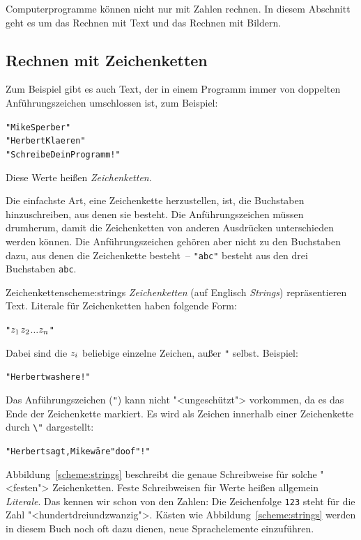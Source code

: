 Computerprogramme können nicht nur mit Zahlen rechnen.  In diesem
Abschnitt geht es um das Rechnen mit Text und das Rechnen mit Bildern.

\subsection{Rechnen mit Zeichenketten}

Zum Beispiel gibt es auch Text, der in einem Programm immer von
doppelten Anführungszeichen umschlossen ist, zum Beispiel:
%
\begin{alltt}
"Mike Sperber"
"Herbert Klaeren"
"Schreibe Dein Programm!"
\end{alltt}
%
Diese Werte heißen \textit{Zeichenketten}.

Die einfachste Art, eine Zeichenkette herzustellen, ist, die
Buchstaben hinzuschreiben, aus denen sie besteht.  Die
Anführungszeichen müssen drumherum, damit die Zeichenketten von anderen
Ausdrücken unterschieden werden können.  Die Anführungszeichen gehören aber nicht
zu den Buchstaben dazu, aus denen die Zeichenkette besteht~--
\verb|"abc"| besteht aus den drei Buchstaben \texttt{abc}.

\begin{feature}{Zeichenketten}{scheme:strings}
\textit{Zeichenketten} (auf Englisch
\textit{Strings}) repräsentieren Text.
Literale für Zeichenketten haben folgende Form:
%
\begin{alltt}
"\(z\sb{1}\)\(z\sb{2}\) \(\ldots\) \(z\sb{n}\)"
\end{alltt}
%
Dabei sind die \(z\sb{i}\) beliebige einzelne Zeichen, außer \verb|"| selbst.
Beispiel:
%
\begin{alltt}
"Herbert was here!"
\end{alltt}
%
Das Anführungszeichen (\verb|"|) kann nicht "<ungeschützt"> vorkommen, da es das Ende der
Zeichenkette markiert. Es wird als Zeichen innerhalb einer Zeichenkette
durch \verb|\"| dargestellt:
%
\begin{alltt}
"Herbert sagt, Mike wäre \backwhack{}"doof\backwhack{}"!"
\end{alltt}
\end{feature}

Abbildung~\ref{scheme:strings} beschreibt die genaue Schreibweise für
solche "<festen"> Zeichenketten.  Feste Schreibweisen für Werte heißen
allgemein \textit{Literale}.  Das kennen wir schon von
den Zahlen: Die Zeichenfolge \texttt{123} steht für die Zahl
"<hundertdreiundzwanzig">.  Kästen wie Abbildung~\ref{scheme:strings}
werden in diesem Buch noch oft dazu dienen, neue Sprachelemente
einzuführen.

